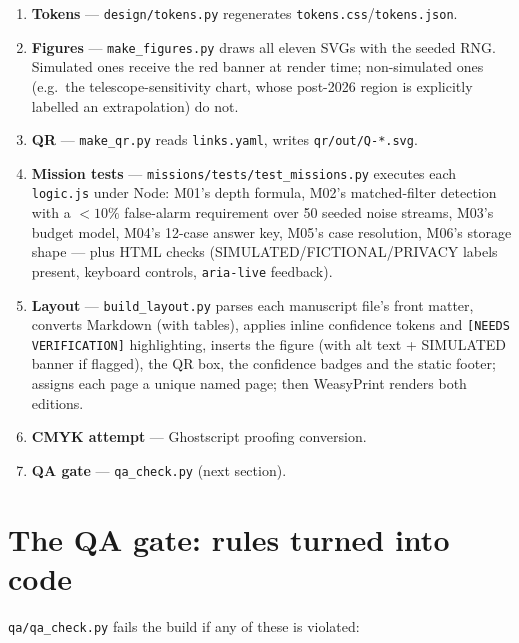 \documentclass[11pt,a4paper]{article}
\newcommand{\code}[1]{\texttt{#1}}
\begin{document}
\begin{enumerate}[leftmargin=6mm]
  \item \textbf{Tokens} --- \code{design/tokens.py} regenerates
        \code{tokens.css}/\code{tokens.json}.
  \item \textbf{Figures} --- \code{make\_figures.py} draws all eleven SVGs
        with the seeded RNG. Simulated ones receive the red banner at render
        time; non-simulated ones (e.g.\ the telescope-sensitivity chart, whose
        post-2026 region is explicitly labelled an extrapolation) do not.
  \item \textbf{QR} --- \code{make\_qr.py} reads \code{links.yaml}, writes
        \code{qr/out/Q-*.svg}.
  \item \textbf{Mission tests} --- \code{missions/tests/test\_missions.py}
        executes each \code{logic.js} under Node: M01's depth formula, M02's
        matched-filter detection with a $<10\%$ false-alarm requirement over
        50 seeded noise streams, M03's budget model, M04's 12-case answer key,
        M05's case resolution, M06's storage shape --- plus HTML checks
        (SIMULATED/FICTIONAL/PRIVACY labels present, keyboard controls,
        \code{aria-live} feedback).
  \item \textbf{Layout} --- \code{build\_layout.py} parses each manuscript
        file's front matter, converts Markdown (with tables), applies inline
        confidence tokens and \texttt{[NEEDS VERIFICATION]} highlighting,
        inserts the figure (with alt text + SIMULATED banner if flagged), the
        QR box, the confidence badges and the static footer; assigns each page
        a unique named page; then WeasyPrint renders both editions.
  \item \textbf{CMYK attempt} --- Ghostscript proofing conversion.
  \item \textbf{QA gate} --- \code{qa\_check.py} (next section).
\end{enumerate}

\section{The QA gate: rules turned into code}

\code{qa/qa\_check.py} fails the build if any of these is violated:
\end{document}
